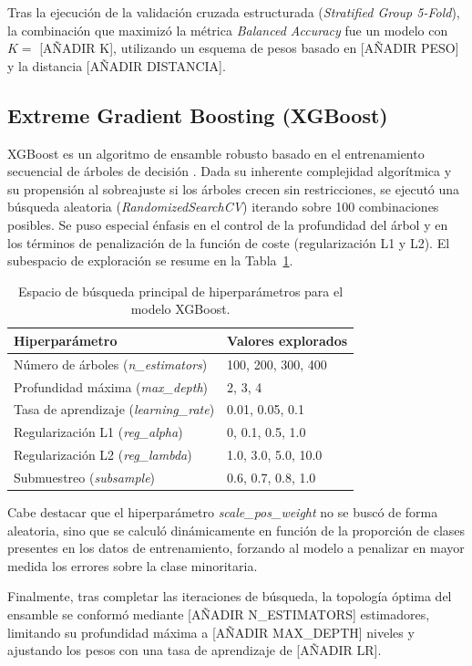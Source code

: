 Tras la ejecución de la validación cruzada estructurada (\textit{Stratified Group 5-Fold}), la combinación que maximizó la métrica \textit{Balanced Accuracy} fue un modelo con $K=$ [AÑADIR K], utilizando un esquema de pesos basado en [AÑADIR PESO] y la distancia [AÑADIR DISTANCIA].

\subsection{Extreme Gradient Boosting (XGBoost)}
XGBoost es un algoritmo de ensamble robusto basado en el entrenamiento secuencial de árboles de decisión \cite{chen2016}. Dada su inherente complejidad algorítmica y su propensión al sobreajuste si los árboles crecen sin restricciones, se ejecutó una búsqueda aleatoria (\textit{RandomizedSearchCV}) iterando sobre 100 combinaciones posibles. Se puso especial énfasis en el control de la profundidad del árbol y en los términos de penalización de la función de coste (regularización L1 y L2). El subespacio de exploración se resume en la Tabla~\ref{tab:grid_xgb}.

\begin{table}[H]
    \centering
    \renewcommand{\arraystretch}{1.2}
    \begin{tabularx}{\textwidth}{>{\raggedright\arraybackslash}p{6cm} X}
        \toprule
        \textbf{Hiperparámetro} & \textbf{Valores explorados} \\
        \midrule
        Número de árboles (\textit{n\_estimators}) & 100, 200, 300, 400 \\
        Profundidad máxima (\textit{max\_depth}) & 2, 3, 4 \\
        Tasa de aprendizaje (\textit{learning\_rate}) & 0.01, 0.05, 0.1 \\
        Regularización L1 (\textit{reg\_alpha}) & 0, 0.1, 0.5, 1.0 \\
        Regularización L2 (\textit{reg\_lambda}) & 1.0, 3.0, 5.0, 10.0 \\
        Submuestreo (\textit{subsample}) & 0.6, 0.7, 0.8, 1.0 \\
        \bottomrule
    \end{tabularx}
    \caption{Espacio de búsqueda principal de hiperparámetros para el modelo XGBoost.}
    \label{tab:grid_xgb}
\end{table}

Cabe destacar que el hiperparámetro \textit{scale\_pos\_weight} no se buscó de forma aleatoria, sino que se calculó dinámicamente en función de la proporción de clases presentes en los datos de entrenamiento, forzando al modelo a penalizar en mayor medida los errores sobre la clase minoritaria. 

Finalmente, tras completar las iteraciones de búsqueda, la topología óptima del ensamble se conformó mediante [AÑADIR N\_ESTIMATORS] estimadores, limitando su profundidad máxima a [AÑADIR MAX\_DEPTH] niveles y ajustando los pesos con una tasa de aprendizaje de [AÑADIR LR].